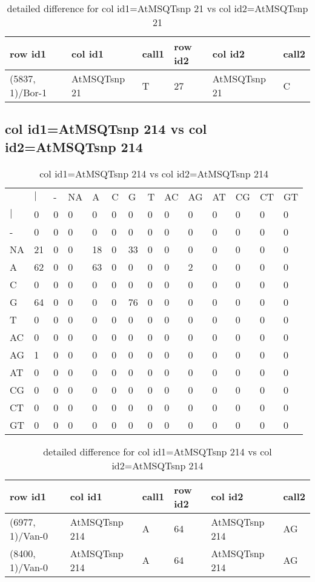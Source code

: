 \begin{center}
\begin{longtable}{|l|l|l|l|l|l|}
\caption{detailed difference for col id1=AtMSQTsnp 21 vs col id2=AtMSQTsnp 21} \label{table_dm773}\\
\hline
row id1&col id1&call1&row id2&col id2&call2\\
\hline
(5837, 1)/Bor-1&AtMSQTsnp 21&T&27&AtMSQTsnp 21&C\\
\hline
\end{longtable}
\end{center}

\subsection{col id1=AtMSQTsnp 214 vs col id2=AtMSQTsnp 214}
\begin{center}
\begin{longtable}{|l|l|l|l|l|l|l|l|l|l|l|l|l|l|}
\caption{col id1=AtMSQTsnp 214 vs col id2=AtMSQTsnp 214} \label{table_dm774}\\
\hline
\\
\hline
&$|$&-&NA&A&C&G&T&AC&AG&AT&CG&CT&GT\\
$|$&0&0&0&0&0&0&0&0&0&0&0&0&0\\
-&0&0&0&0&0&0&0&0&0&0&0&0&0\\
NA&21&0&0&18&0&33&0&0&0&0&0&0&0\\
A&62&0&0&63&0&0&0&0&2&0&0&0&0\\
C&0&0&0&0&0&0&0&0&0&0&0&0&0\\
G&64&0&0&0&0&76&0&0&0&0&0&0&0\\
T&0&0&0&0&0&0&0&0&0&0&0&0&0\\
AC&0&0&0&0&0&0&0&0&0&0&0&0&0\\
AG&1&0&0&0&0&0&0&0&0&0&0&0&0\\
AT&0&0&0&0&0&0&0&0&0&0&0&0&0\\
CG&0&0&0&0&0&0&0&0&0&0&0&0&0\\
CT&0&0&0&0&0&0&0&0&0&0&0&0&0\\
GT&0&0&0&0&0&0&0&0&0&0&0&0&0\\
\hline
\end{longtable}
\end{center}

\begin{center}
\begin{longtable}{|l|l|l|l|l|l|}
\caption{detailed difference for col id1=AtMSQTsnp 214 vs col id2=AtMSQTsnp 214} \label{table_dm775}\\
\hline
row id1&col id1&call1&row id2&col id2&call2\\
\hline
(6977, 1)/Van-0&AtMSQTsnp 214&A&64&AtMSQTsnp 214&AG\\
(8400, 1)/Van-0&AtMSQTsnp 214&A&64&AtMSQTsnp 214&AG\\
\hline
\end{longtable}
\end{center}

